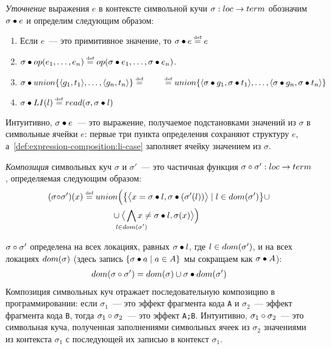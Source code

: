 \begin{defn}\label{def:expression-composition}
\emph{Уточнение} выражения $e$ в контексте символьной кучи $\sigma : loc \rightarrow term$ обозначим $\sigma\bullet e$ и определим следующим образом:
\begin{enumerate}
\item\label{def:expression-composition:leaf-case} Если $e$~--- это примитивное значение, то $\sigma\bullet e\mathrel{\stackrel{\mbox{\normalfont\tiny def}}{=}} e$
\item $\sigma\bullet op(e_1, \ldots, e_n)\mathrel{\stackrel{\mbox{\normalfont\tiny def}}{=}} op(\sigma\bullet e_1, \ldots, \sigma\bullet e_n)$.
\item\label{def:expression-composition:union-case} $\sigma\bullet union\{\langle g_1, t_1\rangle, \ldots, \langle g_n, t_n\rangle\}\mathrel{\stackrel{\mbox{\normalfont\tiny def}}{=}}\\
\qquad\mathrel{\stackrel{\mbox{\normalfont\tiny def}}{=}}union\{\langle\sigma\bullet g_1, \sigma\bullet t_1\rangle, \ldots, \langle\sigma\bullet g_n, \sigma\bullet t_n\rangle\}$
\item\label{def:expression-composition:li-case} $\sigma\bullet LI(l)\mathrel{\stackrel{\mbox{\normalfont\tiny def}}{=}}read(\sigma,\sigma\bullet l)$
\end{enumerate}
\end{defn}
%
Интуитивно, $\sigma\bullet e$~--- это выражение, получаемое подстановками значений из $\sigma$ в символьные ячейки $e$: первые три пункта определения сохраняют структуру $e$, а~\ref{def:expression-composition:li-case} заполняет ячейку значением из $\sigma$.
%
\begin{defn}\label{def:state-composition}
\emph{Композиция} символьных куч $\sigma$ и $\sigma'$~--- это частичная функция $\sigma\circ\sigma' : loc \rightarrow term$, определяемая следующим образом:
\begin{align}\notag
	(\compose{\sigma}{&\sigma'})(x)\eqdef\cmpbody{x}{\sigma'}{\sigma}{\sigma(x)}
\end{align}
\end{defn}
$\sigma\circ\sigma'$ определена на всех локациях, равных $\sigma\bullet l$, где $l\in dom(\sigma')$, и на всех локациях $dom(\sigma)$ (здесь запись $\{\sigma\bullet a \mid a\in A\}$ мы сокращаем как $\sigma\bullet A$):
\begin{align}\label{eq:domain-of-composition}
	dom(\sigma\circ\sigma') = dom(\sigma)\cup\sigma\bullet dom(\sigma')
\end{align}
%
Композиция символьных куч отражает последовательную композицию в программировании: если $\sigma_1$~--- это эффект фрагмента кода \texttt{A} и $\sigma_2$~--- эффект фрагмента кода \texttt{B}, тогда $\sigma_1\circ\sigma_2$~--- это эффект \texttt{A;B}. Интуитивно, $\sigma_1\circ\sigma_2$~--- это символьная куча, полученная заполнениями символьных ячеек из $\sigma_2$ значениями из контекста $\sigma_1$ с последующей их записью в контекст $\sigma_1$.

